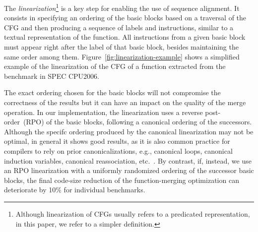 The \textit{linearization}\footnote{Although linearization of CFGs
usually refers to a predicated representation, %
in this paper, we refer to a simpler definition.} is a key step for enabling the
use of sequence alignment.
It consists in specifying an ordering of the basic blocks based on a traversal
of the CFG and then producing a sequence of labels and instructions, similar to a textual representation of the function.
All instructions from a given basic block must appear right after the label of that basic block, besides maintaining the same order among them.
Figure~\ref{fig:linearization-example} shows a simplified example of the linearization of the CFG of a function extracted from the  benchmark in SPEC CPU2006.



The exact ordering chosen for the basic blocks will not compromise the correctness of the results but it can have an impact on the quality of the merge operation.
In our implementation, the linearization uses a reverse post-order~(RPO) of the
basic blocks, following a canonical ordering of the successors.
Although the specifc ordering produced by the canonical linearization may not be optimal,
in general it shows good results, as it is also common practice for compilers to rely on prior canonicalizations, e.g., canonical loops, canonical induction variables, canonical reassociation, etc.~\cite{briggs94,liu96}.
By contrast, if, instead, we use an RPO linearization with a uniformly randomized ordering of the successor basic
blocks, the final code-size reduction of the function-merging optimization can deteriorate by 10\% for individual benchmarks.

